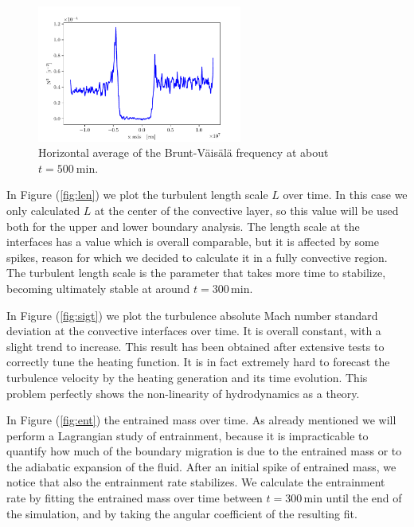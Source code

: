 \begin{figure}[t!]
\centering
\includegraphics[width=0.6\textwidth]{./img/brunt}
\caption{Horizontal average of the Brunt-Väisälä frequency at about $t=500 \ \mathrm{min}$.}
\label{fig:brunt}
\end{figure}
In Figure (\ref{fig:len}) we plot the turbulent length scale $L$ over time. In this case we only calculated $L$ at the center of the convective layer, so this value will be used both for the upper and lower boundary analysis. The length scale at the interfaces has a value which is overall comparable, but it is affected by some spikes, reason for which we decided to calculate it in a fully convective region. The turbulent length scale is the parameter that takes more time to stabilize, becoming ultimately stable at around $t = 300 \, \mathrm{min}$. 
 
In Figure (\ref{fig:sigt}) we plot the turbulence absolute Mach number standard deviation at the convective interfaces over time. It is overall constant, with a slight trend to increase. This result has been obtained after extensive tests to correctly tune the heating function. It is in fact extremely hard to forecast the turbulence velocity by the heating generation and its time evolution. This problem perfectly shows the non-linearity of hydrodynamics as a theory.

In Figure (\ref{fig:ent}) the entrained mass over time. As already mentioned we will perform a Lagrangian study of entrainment, because it is impracticable to quantify how much of the boundary migration is due to the entrained mass or to the adiabatic expansion of the fluid. After an initial spike of entrained mass, we notice that also the entrainment rate stabilizes. We calculate the entrainment rate by fitting the entrained mass over time between $t = 300 \, \mathrm{min}$ until the end of the simulation, and by taking the angular coefficient of the resulting fit. 

